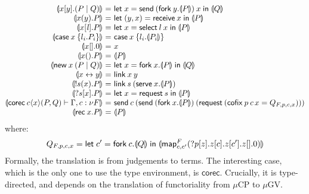 \documentclass[orivec,envcountsame]{llncs}
\makeatletter
\newcommand{\cptyp}[2]{#1 \vdash #2}
\newcommand{\mapname}{\mathsf{map}}
\newcommand{\map}[3]{\mapname^{#1}_{#2}(#3)}
\newcommand{\gvmap}[3]{\mapname^{#1}_{#2}\:#3}
\newcommand{\mkwd}[1]{\mathsf{#1}}
\newcommand{\link}[2]{#1 \leftrightarrow #2}
\newcommand{\cut}[4]{\mkwd{new}\:#1 \: (#3 \mid #4)}
\newcommand{\replicate}[2]{{!#1(#2)}}
\newcommand{\derelict}[2]{{?#1[#2]}}
\newcommand{\rec}[1]{\mkwd{rec}\:#1}
\newcommand{\corec}[5]{\mkwd{corec}\:#1 \langle #2 \rangle (#4,#5)}
\newcommand{\clabel}[1]{\mathrm{#1}}
\renewcommand{\case}[2]{\mkwd{case}\:#1\:\{#2\}}
\newcommand{\sel}[2]{#1[\clabel{#2}]}
\newcommand{\gvsend}[2]{\mkwd{send}\:#1\:#2}
\newcommand{\gvreceive}[1]{\mkwd{receive}\:#1}
\newcommand{\gvlet}[3]{\mkwd{let}\;#1 = #2\;\mkwd{in}\;#3}
\newcommand{\gvselect}[2]{\mkwd{select}\:#1\:#2}
\newcommand{\gvcase}[2]{\mkwd{case}\:#1\:\{#2\}}
\newcommand{\gvlink}[2]{\mkwd{link}\:#1\:#2}
\newcommand{\gvfork}[2]{\mkwd{fork}\:#1.#2}
\newcommand{\lrkwd}{\mkwd{cofix}}
\newcommand{\gvfix}[3]{\lrkwd\:#1\:#2 = #3}
\newcommand{\gvserve}[2]{\mkwd{serve}\:#1.#2}
\newcommand{\gvrequest}[1]{\mkwd{request}\:#1}
\newcommand{\key}{\mkwd}
\newcommand{\togv}[1]{\llparenthesis #1 \rrparenthesis}
\newcommand{\mucp}{$\mu\mathrm{CP}$\xspace}
\newcommand{\mugv}{$\mu\mathrm{GV}$\xspace}
\newcommand{\ba}{\begin{array}}
\newcommand{\ea}{\end{array}}
\newenvironment{equations}{\[\ba{@{}r@{~}c@{~}l@{}}}{\ea\]}
\makeatother
\begin{document}
\begin{equations}
\small
  \togv{x[y].(P \mid Q)} &=&
    \gvlet{x}{\gvsend{(\gvfork{y}{\togv{P}})}{x}}{\togv{Q}} \\
  \togv{x(y).P} &=&
    \gvlet{(y,x)}{\gvreceive{x}}{\togv{P}} \\
  \togv{\sel{x}{\mathit{l}}.P} &=&
    \gvlet{x}{\gvselect{l}{x}}{\togv{P}} \\
  \togv{\case{x}{l_i.P_i}} &=&
    \gvcase{x}{l_i.\togv{P_i}} \\
  \togv{x[].0} &=& x \\
  \togv{x().P} &=& \togv{P} \\
  \togv{\cut{x}{}{P}{Q}} &=&
    \gvlet{x}{\gvfork{x}{\togv{P}}}{\togv{Q}} \\
  \togv{\link{x}{y}} &=& \gvlink{x}{y} \\
  \togv{\replicate{s}{x}.P} &=&
    \gvlink{s}{(\gvserve{x}{\togv{P}})} \\
  \togv{\derelict{s}{x}.P} &=&
    \gvlet{x}{\gvrequest{s}}{\togv{P}} \\
  \togv{\cptyp{\corec{c}{x}{}{P}{Q}}{\Gamma, c:\nu F}} &=&
    \gvsend{c}{(\gvsend{(\gvfork{x}{\togv{P}})}{(\gvrequest{(\gvfix{p}{c\,x}{Q_{F,p,c,x}})})})} \\
  \togv{\rec{x}.P} &=& \togv{P} \\
\end{equations}%
where:
%
\[\small
  Q_{F,p,c,x} =
    \gvlet{c'}{\gvfork{c}{\togv{Q}}}
          {\togv{\map{F}{c,c'}{\derelict{p}{z}.z[c].z[c'].z[].0}}}
\]%
Formally, the translation is from judgements to terms. The interesting case, which is the only one
to use the type environment, is $\key{corec}$. Crucially, it is type-directed, and depends on the
translation of functoriality from \mucp to \mugv.



\end{document}
